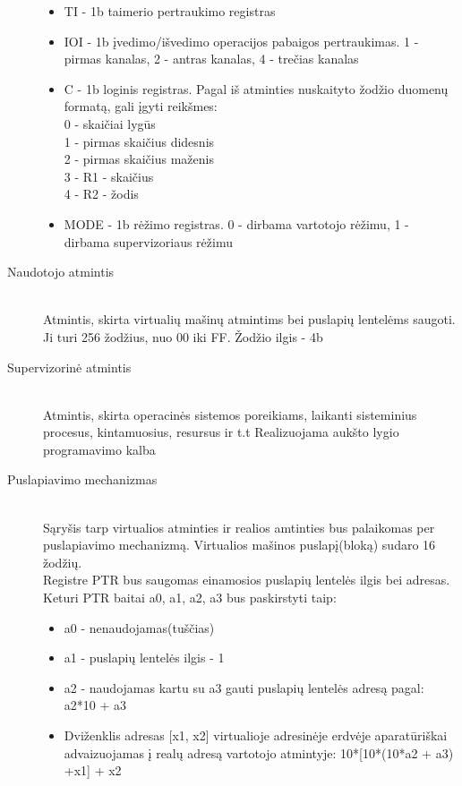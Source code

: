 \begin{description}
\begin{itemize}
  \item TI - 1b taimerio pertraukimo registras
  \item IOI - 1b įvedimo/išvedimo operacijos pabaigos pertraukimas. 1 - pirmas kanalas, 2 - antras kanalas, 4 - trečias kanalas
  \item C - 1b loginis registras. Pagal iš atminties nuskaityto žodžio duomenų formatą, gali įgyti reikšmes: \leavevmode
		\\ 0 - skaičiai lygūs
		\\ 1 - pirmas skaičius didesnis
		\\ 2 - pirmas skaičius maženis
		\\ 3 - R1 - skaičius
		\\ 4 - R2 - žodis

  \item MODE - 1b rėžimo registras. 0 - dirbama vartotojo rėžimu, 1 - dirbama supervizoriaus rėžimu
\end{itemize}

  \item[Naudotojo atmintis] \leavevmode \\
Atmintis, skirta virtualių mašinų atmintims bei puslapių lentelėms saugoti. Ji turi 256 žodžius, nuo 00 iki FF. Žodžio ilgis - 4b
  \item[Supervizorinė atmintis] \leavevmode \\
Atmintis, skirta operacinės sistemos poreikiams, laikanti sisteminius procesus, kintamuosius, resursus ir t.t Realizuojama aukšto lygio programavimo kalba

\item[Puslapiavimo mechanizmas] \leavevmode \\
Sąryšis tarp virtualios atminties ir realios amtinties bus palaikomas per puslapiavimo mechanizmą. Virtualios mašinos puslapį(bloką) sudaro 16 žodžių.
\\ Registre PTR bus saugomas einamosios puslapių lentelės ilgis bei adresas. Keturi PTR baitai a0, a1, a2, a3 bus paskirstyti taip:
\begin{itemize}
\item a0 - nenaudojamas(tuščias)
\item a1 - puslapių lentelės ilgis - 1
\item a2 - naudojamas kartu su a3 gauti puslapių lentelės adresą pagal: a2*10 + a3
\item Dviženklis adresas [x1, x2]  virtualioje adresinėje erdvėje aparatūriškai advaizuojamas į realų adresą vartotojo atmintyje: 10*[10*(10*a2 + a3) +x1] + x2
\end{itemize}


\end{description}
